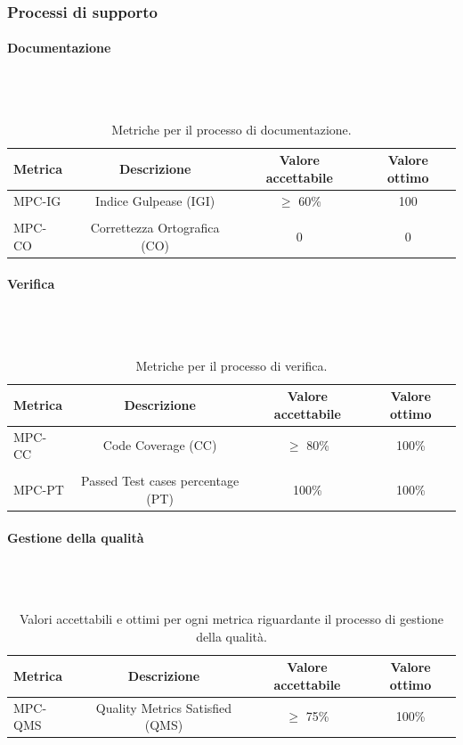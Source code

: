 \documentclass[8pt]{article}
\newcommand{\subsubsubsection}[1]{\paragraph{#1}\mbox{}\\\\}
\begin{document}
\subsubsection{Processi di supporto}
\subsubsubsection{Documentazione}
\begin{table}[h]	
	\centering
	\begin{tabular}{lccc}
		\toprule
		\textbf{Metrica}& \textbf{Descrizione} & \textbf{Valore accettabile} & \textbf{Valore ottimo} \\
		\midrule
		MPC-IG & Indice Gulpease (IGI) & $\geq$ 60\% & 100 \\\\
		MPC-CO & Correttezza Ortografica (CO) & 0 & 0 \\
		\bottomrule
	\end{tabular}
	\caption{Metriche per il processo di documentazione.}
	\label{table:Tabella delle metriche per il processo di documentazione}
\end{table}
\subsubsubsection{Verifica}
\begin{table}[h]	
	\centering
	\begin{tabular}{lccc}
		\toprule
		\textbf{Metrica}& \textbf{Descrizione} & \textbf{Valore accettabile} & \textbf{Valore ottimo} \\
		\midrule
		MPC-CC & Code Coverage (CC) & $\geq$ 80\% & 100\% \\\\
		MPC-PT & Passed Test cases percentage (PT) & 100\% & 100\% \\
		\bottomrule
	\end{tabular}
	\caption{Metriche per il processo di verifica.}
	\label{table:Tabella delle metriche per il processo di verifica}
\end{table}
\subsubsubsection{Gestione della qualità}
\begin{table}[H]	
	\centering
	\begin{tabular}{lccc}
		\toprule
		\textbf{Metrica}& \textbf{Descrizione} & \textbf{Valore accettabile} & \textbf{Valore ottimo} \\
		\midrule
		MPC-QMS & Quality Metrics Satisfied (QMS) & $\geq$ 75\%& 100\%\\
		\bottomrule
	\end{tabular}
	\caption{Valori accettabili e ottimi per ogni metrica riguardante il processo di gestione della qualità.}
	\label{table:Valori accettabili e ottimi per ogni metrica riguardante il processo di gestione della qualità.}
\end{table}
\clearpage
\end{document}
